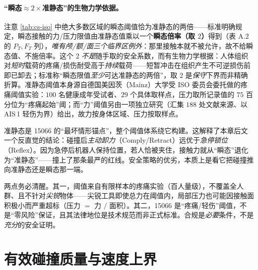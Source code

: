 \paragraph{“瞬态$\approx 2\times$准静态”的生物力学依据。}
注意 \cref{tab:cs-iso} 中绝大多数区域的瞬态阈值恰为准静态的两倍——标准明确规定，瞬态接触的力/压力限值由准静态值乘以一个\textbf{瞬态倍率（取 $2$）}得到（表 A.2 的 $P_T,F_T$ 列），\emph{唯有颅/额/面三个临界区例外}：那里接触本就不被允许，故不给瞬态值、不施倍率。这个 $2$ \emph{不是}随手取的安全系数，而有生物力学根据：人体组织对\emph{短时}载荷的疼痛/损伤耐受高于\emph{持续}载荷——短暂冲击在组织产生不可逆损伤前即已卸去；标准称“瞬态限值\emph{至少}可达准静态的两倍”，取 $2$ 是\emph{保守}下界而非精确折算。准静态阈值本身源自德国美因茨（Mainz）大学受 ISO 委员会委托做的疼痛阈值实验：$100$ 名健康成年受试者、$29$ 个具体取样点，压力取所记录值的 $75$ 百分位为“疼痛起始”阈；而“力”阈值另由一项独立研究（汇集 $188$ 处文献来源、以 AIS\,1 轻伤为界）给出，故力按身体区域、压力按取样点。

\begin{insight}
准静态是 15066 的“最坏情形锚点”，整个阈值体系绕它构建。这解释了本章后文一个反直觉的结论：碰撞后\emph{主动卸力}（Comply/Retract）远优于\emph{急停锁位}（Reflex）。因为急停后机器人保持位置，若人恰被夹住，接触力就从“瞬态”退化为“准静态”——撞上了那条最严的红线。安全策略的优劣，本质上是看它把碰撞推向准静态还是瞬态那一端。
\end{insight}

\begin{pitfall}
两点务必清醒。其一，阈值来自有限样本的疼痛实验（百人量级），不覆盖全人群、且不针对\emph{尖锐}物体——尖锐工具即使总力在阈值内，局部压力也可能因接触面积极小而严重超标（压力 $=$ 力 $/$ 面积）。其二，15066 是“疼痛/轻伤”阈值，不是“零风险”保证，且其法律地位是技术规范而非正式标准。合规是\emph{必要}条件，不是\emph{充分}的安全证明。
\end{pitfall}

\section{有效碰撞质量与速度上界}
\label{sec:cs-mass}

